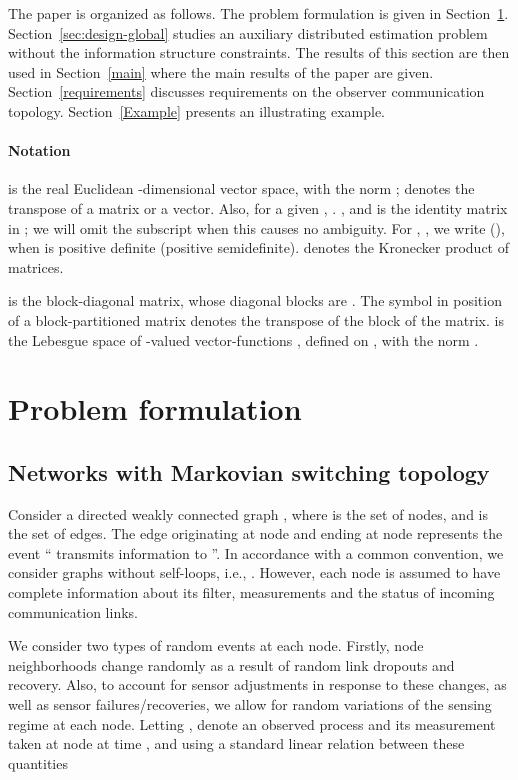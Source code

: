 \documentclass[a4paper,twocolumn]{autart}
\begin{document}
The paper is organized as follows. The problem formulation is given in
Section~\ref{Distr.Cons}. Section~\ref{sec:design-global} studies an
auxiliary distributed 
estimation problem without the information structure constraints. The
results of this section are then used in Section~\ref{main} where the main
results of the paper are given. Section~\ref{requirements} discusses
requirements on the observer communication
topology. Section~\ref{Example} presents an
illustrating example. 


\paragraph*{Notation}  is the real
Euclidean -dimensional vector space, with the norm ;   denotes the transpose of a matrix or a
vector. Also, for a given ,
. 
, and
 is the identity matrix in ; we will omit the
subscript  when this causes no ambiguity. 
For , ,
we write  (), when   is positive definite
(positive semidefinite).  
  denotes the Kronecker product of matrices.

  is the block-diagonal matrix, whose  diagonal
  blocks are . The symbol  in  position 
of a block-partitioned matrix denotes the transpose of the  block of
the matrix.  is the Lebesgue space of
-valued vector-functions , defined on ,
with the norm . 


\section{Problem formulation}\label{Distr.Cons}

\subsection{Networks with Markovian switching topology}\label{networks}

Consider a directed weakly connected
graph , where 
is the set of nodes, and  is the set of edges. The edge  
originating at node  and ending at node  represents the event ``
transmits information to ''. In accordance with a common convention, we
consider graphs without 
self-loops, i.e., . However, each node is assumed
to have complete information about its filter, measurements and the
status of incoming communication links. 

We consider two types of random events at each
node. Firstly, node neighborhoods change randomly as a result of random link
dropouts and recovery. Also, to account for sensor adjustments in
response to these changes, as well as sensor failures/recoveries, we 
allow for random variations of the sensing regime at each node. 
Letting ,  denote an
observed process and its measurement taken at node  at time , and
using a standard linear relation between these quantities
\end{document}
